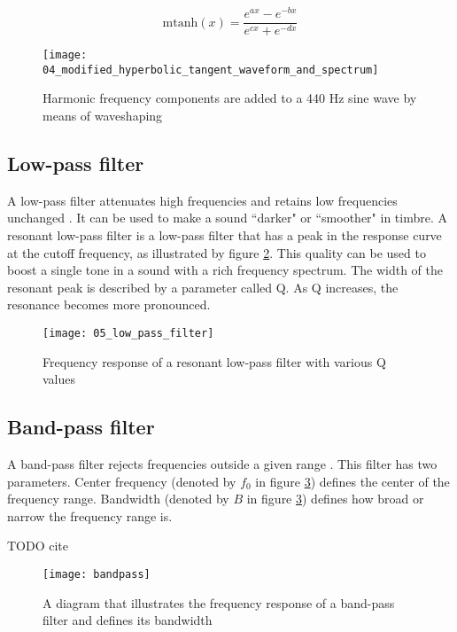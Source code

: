 $$\text{mtanh}(x)=\frac{e^{ax}-e^{-bx}}{e^{cx}+e^{-dx}}$$

\begin{figure}[h]
    \centering
    \texttt{[image: 04\_modified\_hyperbolic\_tangent\_waveform\_and\_spectrum]}
    \caption{Harmonic frequency components are added to a 440 Hz sine wave by means of waveshaping}
    \label{fig:modified_hyperbolic_tangent_waveform_and_spectrum}
\end{figure}

\subsection{Low-pass filter}
A low-pass filter attenuates high frequencies and retains low frequencies unchanged \citep{dodge_jerse_1997}. It can be used to make a sound ``darker" or ``smoother" in timbre. A resonant low-pass filter is a low-pass filter that has a peak in the response curve at the cutoff frequency, as illustrated by figure \ref{fig:low_pass_filter}. This quality can be used to boost a single tone in a sound with a rich frequency spectrum. The width of the resonant peak is described by a parameter called Q. As Q increases, the resonance becomes more pronounced.

\begin{figure}[H]
    \centering
    \texttt{[image: 05\_low\_pass\_filter]}
    \caption{Frequency response of a resonant low-pass filter with various Q values}
    \label{fig:low_pass_filter}
\end{figure}

\subsection{Band-pass filter}
A band-pass filter rejects frequencies outside a given range \citep{dodge_jerse_1997}. This filter has two parameters. Center frequency (denoted by $f_0$ in figure \ref{fig:bandpass}) defines the center of the frequency range. Bandwidth (denoted by $B$ in figure \ref{fig:bandpass}) defines how broad or narrow the frequency range is.

TODO cite

\begin{figure}[H]
    \centering
    \texttt{[image: bandpass]}
    \caption{A diagram that illustrates the frequency response of a band-pass filter and defines its bandwidth}
    \label{fig:bandpass}
\end{figure}

